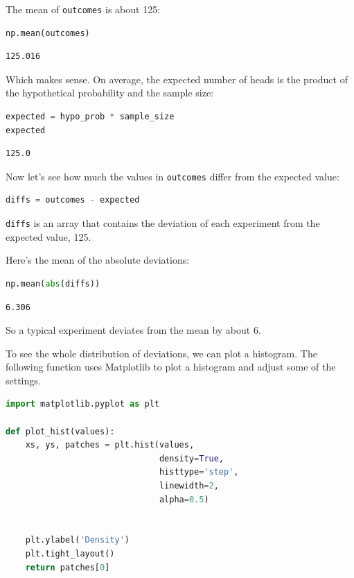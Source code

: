 The mean of \passthrough{\lstinline!outcomes!} is about 125:

\begin{lstlisting}[language=Python,style=source]
np.mean(outcomes)
\end{lstlisting}

\begin{lstlisting}[style=output]
125.016
\end{lstlisting}

Which makes sense. On average, the expected number of heads is the
product of the hypothetical probability and the sample size:

\begin{lstlisting}[language=Python,style=source]
expected = hypo_prob * sample_size
expected
\end{lstlisting}

\begin{lstlisting}[style=output]
125.0
\end{lstlisting}

Now let's see how much the values in \passthrough{\lstinline!outcomes!}
differ from the expected value:

\begin{lstlisting}[language=Python,style=source]
diffs = outcomes - expected
\end{lstlisting}

\passthrough{\lstinline!diffs!} is an array that contains the deviation
of each experiment from the expected value, 125.

Here's the mean of the absolute deviations:

\begin{lstlisting}[language=Python,style=source]
np.mean(abs(diffs))
\end{lstlisting}

\begin{lstlisting}[style=output]
6.306
\end{lstlisting}

So a typical experiment deviates from the mean by about 6.

To see the whole distribution of deviations, we can plot a histogram.
The following function uses Matplotlib to plot a histogram and adjust
some of the settings.

\begin{lstlisting}[language=Python,style=source]
import matplotlib.pyplot as plt

def plot_hist(values):
    xs, ys, patches = plt.hist(values,
                               density=True,
                               histtype='step',
                               linewidth=2,
                               alpha=0.5)
    
    
    plt.ylabel('Density')
    plt.tight_layout()
    return patches[0]
\end{lstlisting}


